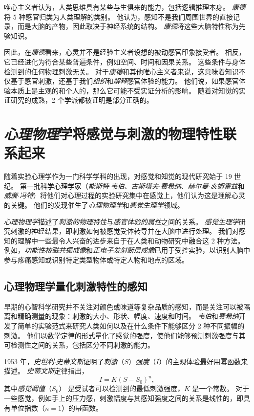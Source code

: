 唯心主义者认为，人类思维具有某些与生俱来的能力，包括逻辑推理本身。
\textit{康德}将 5 种感官归类为人类理解的类别。
他认为，感知不是我们周围世界的直接记录，而是大脑的产物，因此取决于神经系统的结构。
\textit{康德}将这些大脑特性称为先验知识。


因此，在\textit{康德}看来，心灵并不是经验主义者设想的被动感官印象接受者。
相反，它已经进化为符合某些普遍条件，例如空间、时间和因果关系。
这些条件与身体检测到的任何物理刺激无关。 
对于\textit{康德}和其他唯心主义者来说，这意味着知识不仅基于感官刺激，还基于我们\textit{组织}和\textit{解释}感官体验的能力。
他们说，如果感官体验本质上是主观的和个人的，那么它可能不受实证分析的影响。
随着对知觉的实证研究的成熟，2 个学派都被证明是部分正确的。



\section{\textit{心理物理}学将感觉与刺激的物理特性联系起来}

随着实验心理学作为一门科学学科的出现，对感觉和知觉的现代研究始于 19 世纪。
第一批科学心理学家（\textit{能斯特$\cdot$韦伯}、\textit{古斯塔夫$\cdot$费希纳}、\textit{赫尔曼$\cdot$亥姆霍兹}和\textit{威廉$\cdot$冯特}）将他们对心理过程的实验研究集中在感觉上，他们认为这是理解心灵的关键。
他们的发现催生了\textit{心理物理学}和\textit{感觉生理学}领域。


\textit{心理物理学}描述了\textit{刺激的物理特性}与\textit{感官体验的属性}之间的关系。 
\textit{感觉生理学}研究刺激的神经结果，即刺激如何被感觉受体转导并在大脑中进行处理。
我们对感知的理解中一些最令人兴奋的进步来自于在人类和动物研究中融合这 2 种方法。
例如，\textit{功能性核磁共振成像}和\textit{正电子发射断层成像}已用于受控实验，以识别人脑中参与疼痛感知或识别特定类型物体或特定人物和地点的区域。


\subsection{心理物理学量化刺激特性的感知}

早期的心智科学研究并不关注对颜色或味道等复杂品质的感知，而是关注可以被隔离和精确测量的现象：刺激的大小、形状、幅度、速度和时间。
\textit{韦伯}和\textit{费希纳}开发了简单的实验范式来研究人类如何以及在什么条件下能够区分 2 种不同振幅的刺激。
他们以数学定律的形式量化了感觉的强度，使他们能够预测刺激强度与其可检测性之间的关系，包括区分不同刺激的能力。


1953 年，\textit{史坦利$\cdot$史蒂文斯}证明了\textit{刺激}（$ S $）\textit{强度}（$ I $）的主观体验最好用幂函数来描述。 
\textit{史蒂文斯}定律指出，
\begin{equation}
	I = K(S-S_0)^n,
\end{equation}
其中\textit{感觉阈值}（$ S_0 $） 是受试者可以检测到的最低刺激强度，$K$ 是一个常数。 
对于一些感觉，例如手上的压力感，刺激幅度与其感知强度之间的关系是线性的，即具有单位指数（$ n = 1 $）的幂函数。


